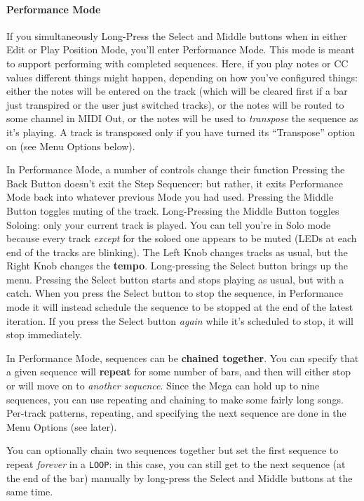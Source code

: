 \documentclass{article}
\begin{document}
\paragraph{Performance Mode} If you simultaneously Long-Press the Select and Middle buttons when in either Edit or Play Position Mode, you'll enter Performance Mode.  This mode is meant to support performing with completed sequences.  Here, if you play notes or CC values different things might happen, depending on how you've configured things: either the notes will be entered on the track (which will be cleared first if a bar just transpired or the user just switched tracks), or the notes will be routed to some channel in MIDI Out, or the notes will be used to {\it transpose} the sequence as it's playing.  A track is transposed only if you have turned its ``Transpose'' option on (see Menu Options below).

In Performance Mode, a number of controls change their function  Pressing the Back Button doesn't exit the Step Sequencer: but rather, it exits Performance Mode back into whatever previous Mode you had used.  Pressing the Middle Button toggles muting of  the track.  Long-Pressing the Middle Button toggles Soloing: only your current track is played.  You can tell you're in Solo mode because every track {\it except} for the soloed one appears to be muted (LEDs at each end of the tracks are blinking).  The Left Knob changes tracks as usual, but the Right Knob changes the {\bf tempo}.  Long-pressing the Select button brings up the menu.  Pressing the Select button starts and stops playing as usual, but with a catch.  When you press the Select button to stop the sequence, in Performance mode it will instead schedule the sequence to be stopped at the end of the latest iteration.  If you press the Select button {\it again} while it's scheduled to stop, it will stop immediately.

In Performance Mode, sequences can be {\bf chained together}.  You can specify that a given sequence will {\bf repeat} for some number of bars, and then will either stop or will move on to {\it another sequence}.  Since the Mega can hold up to nine sequences, you can use repeating and chaining to make some fairly long songs.  Per-track patterns, repeating, and specifying the next sequence are done in the Menu Options (see later).

You can optionally chain two sequences together but set the first sequence to repeat {\it forever} in a {\tt LOOP}: in this case, you can still get to the next sequence (at the end of the bar) manually by long-press the Select and Middle buttons at the same time.
\end{document}
